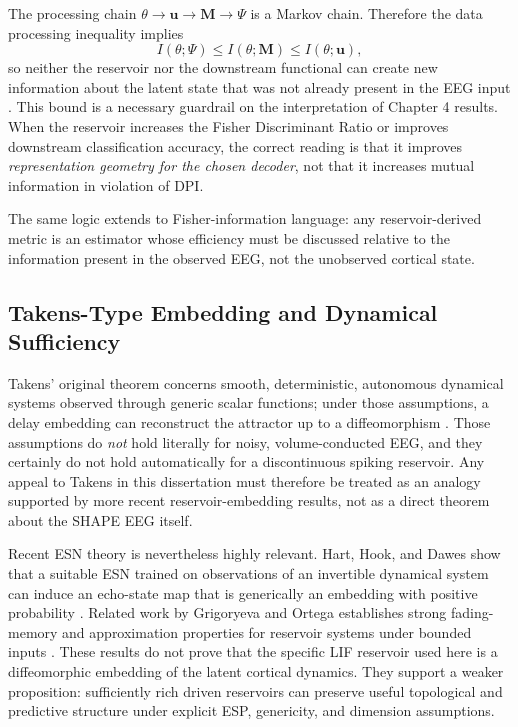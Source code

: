 The processing chain $\theta \rightarrow \mathbf{u} \rightarrow \mathbf{M} \rightarrow \Psi$ is a Markov chain. Therefore the data processing inequality implies
\begin{equation}
I(\theta;\Psi)\leq I(\theta;\mathbf{M})\leq I(\theta;\mathbf{u}),
\end{equation}
so neither the reservoir nor the downstream functional can create new information about the latent state that was not already present in the EEG input \cite{cover_elements_2006}. This bound is a necessary guardrail on the interpretation of Chapter 4 results. When the reservoir increases the Fisher Discriminant Ratio or improves downstream classification accuracy, the correct reading is that it improves \emph{representation geometry for the chosen decoder}, not that it increases mutual information in violation of DPI.

The same logic extends to Fisher-information language: any reservoir-derived metric is an estimator whose efficiency must be discussed relative to the information present in the observed EEG, not the unobserved cortical state.

\subsection{Takens-Type Embedding and Dynamical Sufficiency}

Takens' original theorem concerns smooth, deterministic, autonomous dynamical systems observed through generic scalar functions; under those assumptions, a delay embedding can reconstruct the attractor up to a diffeomorphism \cite{takens_detecting_1981}. Those assumptions do \emph{not} hold literally for noisy, volume-conducted EEG, and they certainly do not hold automatically for a discontinuous spiking reservoir. Any appeal to Takens in this dissertation must therefore be treated as an analogy supported by more recent reservoir-embedding results, not as a direct theorem about the SHAPE EEG itself.

Recent ESN theory is nevertheless highly relevant. Hart, Hook, and Dawes show that a suitable ESN trained on observations of an invertible dynamical system can induce an echo-state map that is generically an embedding with positive probability \cite{hart_embedding_2020}. Related work by Grigoryeva and Ortega establishes strong fading-memory and approximation properties for reservoir systems under bounded inputs \cite{grigoryeva_echo_2018}. These results do not prove that the specific LIF reservoir used here is a diffeomorphic embedding of the latent cortical dynamics. They support a weaker proposition: sufficiently rich driven reservoirs can preserve useful topological and predictive structure under explicit ESP, genericity, and dimension assumptions.

